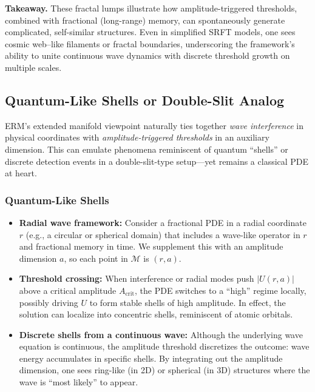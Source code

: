 \documentclass[12pt]{article}
\begin{document}
\medskip

\noindent
\textbf{Takeaway.} These fractal lumps illustrate how amplitude-triggered 
thresholds, combined with fractional (long-range) memory, can spontaneously 
generate complicated, self-similar structures. Even in simplified SRFT models, 
one sees cosmic web–like filaments or fractal boundaries, underscoring the 
framework’s ability to unite continuous wave dynamics with discrete 
threshold growth on multiple scales.


\subsection{Quantum-Like Shells or Double-Slit Analog}
\label{subsec:quantum_shells_doubleslit}

ERM’s extended manifold viewpoint naturally ties together \emph{wave interference}
in physical coordinates with \emph{amplitude-triggered thresholds} in an auxiliary
dimension. This can emulate phenomena reminiscent of quantum “shells” or discrete
detection events in a double-slit-type setup—yet remains a classical PDE at heart.

\subsubsection{Quantum-Like Shells}
\begin{itemize}
    \item \textbf{Radial wave framework:}
    Consider a fractional PDE in a radial coordinate $r$ (e.g., a circular or
    spherical domain) that includes a wave-like operator in $r$ and fractional
    memory in time. We supplement this with an amplitude dimension $a$, so each
    point in $\mathcal{M}$ is $(r,a)$.
    \item \textbf{Threshold crossing:}
    When interference or radial modes push $|U(r,a)|$ above a critical amplitude
    $A_{\mathrm{crit}}$, the PDE switches to a “high” regime locally, possibly
    driving $U$ to form stable shells of high amplitude. In effect, the solution
    can localize into concentric shells, reminiscent of atomic orbitals.
    \item \textbf{Discrete shells from a continuous wave:}
    Although the underlying wave equation is continuous, the amplitude threshold
    discretizes the outcome: wave energy accumulates in specific shells. By
    integrating out the amplitude dimension, one sees ring-like (in 2D) or
    spherical (in 3D) structures where the wave is “most likely” to appear.
\end{itemize}
\end{document}

